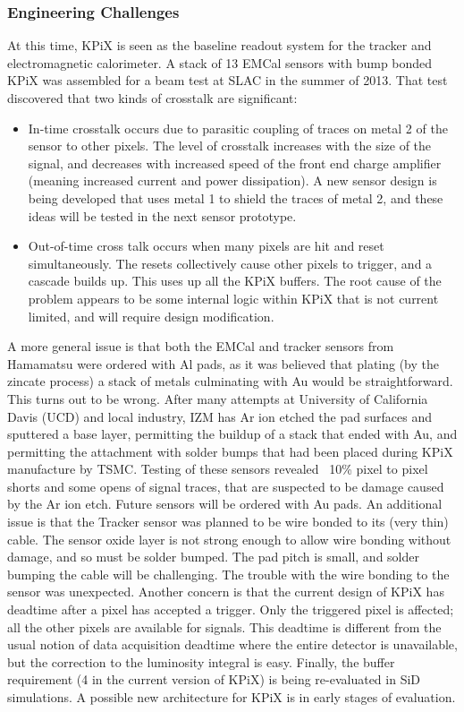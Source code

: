 \subsubsection{Engineering Challenges}
At this time, KPiX is seen as the baseline readout system for the tracker and electromagnetic calorimeter. A stack of 13 EMCal sensors with bump bonded KPiX was assembled for a beam test at SLAC in the summer of 2013. That test discovered that two kinds of crosstalk are significant:
\begin{itemize}
	\item In-time crosstalk occurs due to parasitic coupling of traces on metal 2 of the sensor to other pixels. The level of crosstalk increases with the size of the signal, and decreases with increased speed of the front end charge amplifier (meaning increased current and power dissipation).  A new sensor design is being developed that uses metal 1 to shield the traces of metal 2, and these ideas will be tested in the next sensor prototype.
	\item Out-of-time cross talk occurs when many pixels are hit and reset simultaneously. The resets collectively cause other pixels to trigger, and a cascade builds up. This uses up all the KPiX buffers. The root cause of the problem appears to be some internal logic within KPiX that is not current limited, and will require design modification.
\end{itemize}
A more general issue is that both the EMCal and tracker sensors from Hamamatsu were ordered with Al pads, as it was believed that plating (by the zincate process) a stack of metals culminating with Au would be straightforward. This turns out to be wrong. After many attempts at University of California Davis (UCD) and local industry, IZM  has Ar ion etched the pad surfaces and sputtered a base layer, permitting the buildup of a stack that ended with Au, and permitting the attachment with solder bumps that had been placed during KPiX manufacture by TSMC. Testing of these sensors revealed ~10\% pixel to pixel shorts and some opens of signal traces, that are suspected to be damage caused by the Ar ion etch. Future sensors will be ordered with Au pads. 
An additional issue is that the Tracker sensor was planned to be wire bonded to its (very thin) cable. The sensor oxide layer is not strong enough to allow wire bonding without damage, and so must be solder bumped. The pad pitch is small, and solder bumping the cable will be challenging. The trouble with the wire bonding to the sensor was unexpected.
Another concern is that the current design of KPiX has deadtime after a pixel has accepted a trigger. Only the triggered pixel is affected; all the other pixels are available for signals. This deadtime is different from the usual notion of data acquisition deadtime where the entire detector is unavailable, but the correction to the luminosity integral is easy. Finally, the buffer requirement (4 in the current version of KPiX) is being re-evaluated in SiD simulations. A possible new architecture for KPiX is in early stages of evaluation. 
